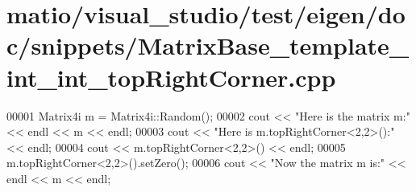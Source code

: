 \hypertarget{matio_2visual__studio_2test_2eigen_2doc_2snippets_2_matrix_base__template__int__int__top_right_corner_8cpp_source}{}\section{matio/visual\+\_\+studio/test/eigen/doc/snippets/\+Matrix\+Base\+\_\+template\+\_\+int\+\_\+int\+\_\+top\+Right\+Corner.cpp}
\label{matio_2visual__studio_2test_2eigen_2doc_2snippets_2_matrix_base__template__int__int__top_right_corner_8cpp_source}

\begin{DoxyCode}
00001 Matrix4i m = Matrix4i::Random();
00002 cout << \textcolor{stringliteral}{"Here is the matrix m:"} << endl << m << endl;
00003 cout << \textcolor{stringliteral}{"Here is m.topRightCorner<2,2>():"} << endl;
00004 cout << m.topRightCorner<2,2>() << endl;
00005 m.topRightCorner<2,2>().setZero();
00006 cout << \textcolor{stringliteral}{"Now the matrix m is:"} << endl << m << endl;
\end{DoxyCode}
